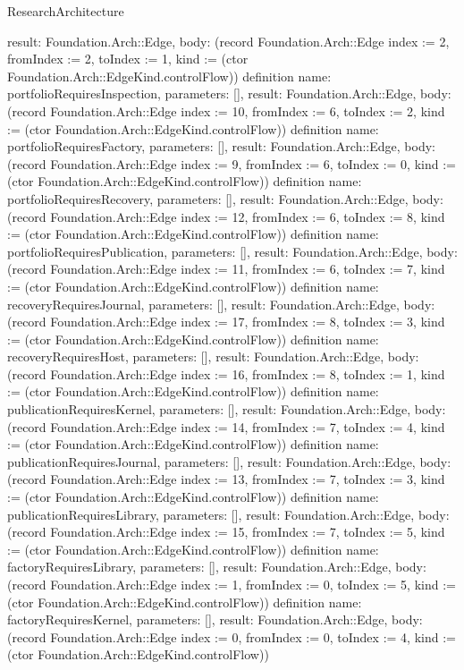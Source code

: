 \begin{lexlean}{ResearchArchitecture}
\begin{semanticmodule}
{ result: Foundation.Arch::Edge,
 body: (record Foundation.Arch::Edge {index := 2, fromIndex := 2, toIndex := 1, kind := (ctor Foundation.Arch::EdgeKind.controlFlow)})
}
definition{
 name: portfolioRequiresInspection,
 parameters: [],
 result: Foundation.Arch::Edge,
 body: (record Foundation.Arch::Edge {index := 10, fromIndex := 6, toIndex := 2, kind := (ctor Foundation.Arch::EdgeKind.controlFlow)})
}
definition{
 name: portfolioRequiresFactory,
 parameters: [],
 result: Foundation.Arch::Edge,
 body: (record Foundation.Arch::Edge {index := 9, fromIndex := 6, toIndex := 0, kind := (ctor Foundation.Arch::EdgeKind.controlFlow)})
}
definition{
 name: portfolioRequiresRecovery,
 parameters: [],
 result: Foundation.Arch::Edge,
 body: (record Foundation.Arch::Edge {index := 12, fromIndex := 6, toIndex := 8, kind := (ctor Foundation.Arch::EdgeKind.controlFlow)})
}
definition{
 name: portfolioRequiresPublication,
 parameters: [],
 result: Foundation.Arch::Edge,
 body: (record Foundation.Arch::Edge {index := 11, fromIndex := 6, toIndex := 7, kind := (ctor Foundation.Arch::EdgeKind.controlFlow)})
}
definition{
 name: recoveryRequiresJournal,
 parameters: [],
 result: Foundation.Arch::Edge,
 body: (record Foundation.Arch::Edge {index := 17, fromIndex := 8, toIndex := 3, kind := (ctor Foundation.Arch::EdgeKind.controlFlow)})
}
definition{
 name: recoveryRequiresHost,
 parameters: [],
 result: Foundation.Arch::Edge,
 body: (record Foundation.Arch::Edge {index := 16, fromIndex := 8, toIndex := 1, kind := (ctor Foundation.Arch::EdgeKind.controlFlow)})
}
definition{
 name: publicationRequiresKernel,
 parameters: [],
 result: Foundation.Arch::Edge,
 body: (record Foundation.Arch::Edge {index := 14, fromIndex := 7, toIndex := 4, kind := (ctor Foundation.Arch::EdgeKind.controlFlow)})
}
definition{
 name: publicationRequiresJournal,
 parameters: [],
 result: Foundation.Arch::Edge,
 body: (record Foundation.Arch::Edge {index := 13, fromIndex := 7, toIndex := 3, kind := (ctor Foundation.Arch::EdgeKind.controlFlow)})
}
definition{
 name: publicationRequiresLibrary,
 parameters: [],
 result: Foundation.Arch::Edge,
 body: (record Foundation.Arch::Edge {index := 15, fromIndex := 7, toIndex := 5, kind := (ctor Foundation.Arch::EdgeKind.controlFlow)})
}
definition{
 name: factoryRequiresLibrary,
 parameters: [],
 result: Foundation.Arch::Edge,
 body: (record Foundation.Arch::Edge {index := 1, fromIndex := 0, toIndex := 5, kind := (ctor Foundation.Arch::EdgeKind.controlFlow)})
}
definition{
 name: factoryRequiresKernel,
 parameters: [],
 result: Foundation.Arch::Edge,
 body: (record Foundation.Arch::Edge {index := 0, fromIndex := 0, toIndex := 4, kind := (ctor Foundation.Arch::EdgeKind.controlFlow)})
}
\end{semanticmodule}
\end{lexlean}
